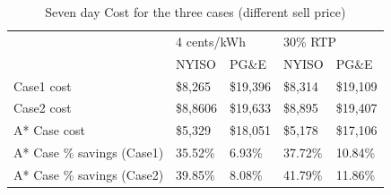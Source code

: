 

\begin{table}[htb]
\caption{Seven day Cost for the three cases (different sell price)}
\label{tab:Cost}
\centering

\begin{tabular}{l|l|l|l|l|}
\cline{2-5}
                            & \multicolumn{2}{l|}{4 cents/kWh} & \multicolumn{2}{l|}{30\% RTP}   \\ \cline{2-5} 
                            & NYISO           & PG\&E          & NYISO          & PG\&E          \\ \hline
\multicolumn{1}{|l|}{Case1 cost} & \$8,265  & \$19,396 & \$8,314 & \$19,109 \\ \hline
\multicolumn{1}{|l|}{Case2 cost} & \$8,8606  & \$19,633 & \$8,895 & \$19,407 \\ \hline
\multicolumn{1}{|l|}{A* Case cost} & \$5,329  & \$18,051 & \$5,178 & \$17,106 \\ \hline
\multicolumn{1}{|l|}{A* Case \% savings (Case1)} & 35.52\%         & 6.93\%         & 37.72\%        & 10.84\%        \\ \hline
\multicolumn{1}{|l|}{A* Case \% savings (Case2)} & 39.85\%         & 8.08\%         & 41.79\%        & 11.86\%        \\ \hline
\end{tabular}

\end{table}

